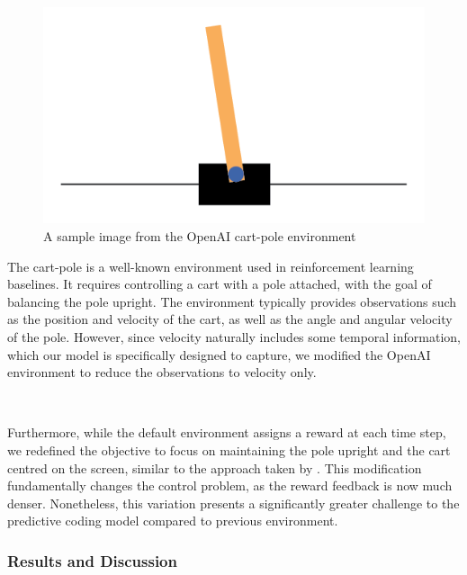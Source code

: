 \documentclass{article}
\begin{document}
\begin{figure}[htbp]
    \centering
    \includegraphics[scale=1.5]{images/cart_pole.png}
    \caption{A sample image from the OpenAI cart-pole environment}
    \label{fig:cart_pole}
\end{figure}

The cart-pole is a well-known environment used in reinforcement learning baselines. It requires controlling a cart with a pole attached, with the goal of balancing the pole upright. The environment typically provides observations such as the position and velocity of the cart, as well as the angle and angular velocity of the pole. However, since velocity naturally includes some temporal information, which our model is specifically designed to capture, we modified the OpenAI \citep{towers2024gymnasium} environment to reduce the observations to velocity only.

\

Furthermore, while the default environment assigns a reward at each time step, we redefined the objective to focus on maintaining the pole upright and the cart centred on the screen, similar to the approach taken by \citet{millidge2019combining}. This modification fundamentally changes the control problem, as the reward feedback is now much denser. Nonetheless, this variation presents a significantly greater challenge to the predictive coding model compared to previous environment.

\subsubsection{Results and Discussion}
\end{document}
